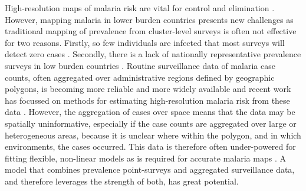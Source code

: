 \documentclass[review]{elsarticle}
\begin{document}
High-resolution maps of malaria risk are vital for control and elimination \citep{weiss2019mapping, battle2019mapping}.
However, mapping malaria in lower burden countries presents new challenges as traditional mapping of prevalence from cluster-level surveys \citep{weiss2019mapping,battle2019mapping, bhatt2017improved, bhatt2015effect} is often not effective for two reasons.
Firstly, so few individuals are infected that most surveys will detect zero cases \citep{sturrock2016mapping}.
Secondly, there is a lack of nationally representative prevalence surveys in low burden countries \citep{sturrock2016mapping, sturrock2014fine}. 
Routine surveillance data of malaria case counts, often aggregated over administrative regions defined by geographic polygons, is becoming more reliable and more widely available \citep{sturrock2016mapping} and recent work has focussed on methods for estimating high-resolution malaria risk from these data \citep{sturrock2014fine, wilson2017pointless, law2018variational, taylor2017continuous, li2012log}. 
However, the aggregation of cases over space means that the data may be spatially uninformative, especially if the case counts are aggregated over large or heterogeneous areas, because it is unclear where within the polygon, and in which environments, the cases occurred. 
This data is therefore often under-powered for fitting flexible, non-linear models as is required for accurate malaria maps \citep{bhatt2017improved, bhatt2015effect}. 
A model that combines prevalence point-surveys and aggregated surveillance data, and therefore leverages the strength of both, has great potential.
\end{document}
